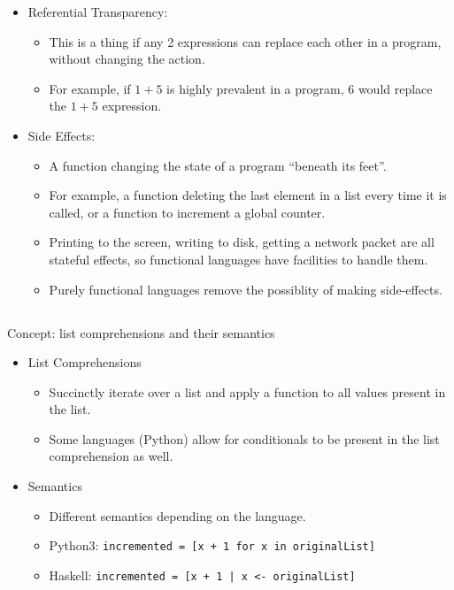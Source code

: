 \begin{itemize}
\item Referential Transparency:
  \begin{itemize}[noitemsep]
  \item This is a thing if any 2 expressions can replace each other in a program, without changing the action.
  \item For example, if $1+5$ is highly prevalent in a program, $6$ would replace the $1+5$ expression.
  \end{itemize}

\item Side Effects:
  \begin{itemize}[noitemsep]
  \item A function changing the state of a program ``beneath its feet''.
  \item For example, a function deleting the last element in a list every time it is called, or a function to increment a global counter.
  \item Printing to the screen, writing to disk, getting a network packet are all stateful effects, so functional languages have facilities to handle them.
  \item Purely functional languages remove the possiblity of making side-effects.
  \end{itemize}
\end{itemize}

\subsection{}
Concept: list comprehensions and their semantics

\begin{itemize}
\item List Comprehensions
  \begin{itemize}[noitemsep]
  \item Succinctly iterate over a list and apply a function to all values present in the list.
  \item Some languages (Python) allow for conditionals to be present in the list comprehension as well.
  \end{itemize}

\item Semantics
  \begin{itemize}[noitemsep]
  \item Different semantics depending on the language.
  \item Python3: \texttt{incremented = [x + 1 for x in originalList]}
  \item Haskell: \texttt{incremented = [x + 1 | x <- originalList]}
  \end{itemize}
\end{itemize}

